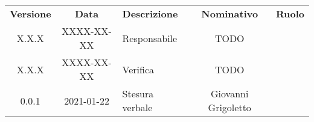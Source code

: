 {
    \renewcommand{\arraystretch}{1.5}
    \centering
    \begin{longtable}{ c c  C{4cm}  c  c }
        \rowcolor{\primaryColor}
        \textcolor{\secondaryColor}{
        \textbf{Versione}}     & \textcolor{\secondaryColor}{\textbf{Data}}       & \textcolor{\secondaryColor}
        {\textbf{Descrizione}} & \textcolor{\secondaryColor}{\textbf{Nominativo}} & \textcolor{\secondaryColor}{\textbf{Ruolo}}                          \\


        X.X.X                  & XXXX-XX-XX                                       & Responsabile                                & TODO & \responsabile{} \\
        X.X.X                  & XXXX-XX-XX                                       & Verifica                                    & TODO & \verificatore{} \\
        0.0.1                  & 2021-01-22                                       & Stesura verbale                           & Giovanni Grigoletto & \redattore{}    \\
    \end{longtable}
}